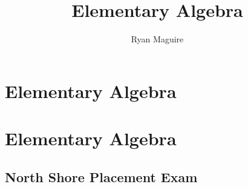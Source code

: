 \documentclass[crop=false,class=book,oneside]{standalone}
\begin{document}
    \ifx\ifmathcourses\undefined
        \title{Elementary Algebra}
        \author{Ryan Maguire}
        \date{\vspace{-5ex}}
        \maketitle
        \tableofcontents
        \chapter*{Elementary Algebra}
        \setcounter{chapter}{1}
    \else
        \chapter{Elementary Algebra}
    \fi
    \section{North Shore Placement Exam}
\end{document}
